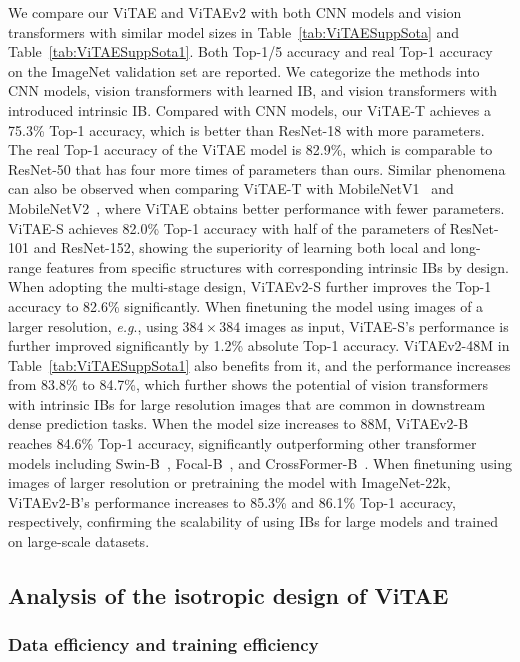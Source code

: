 \documentclass[twocolumn]{svjour3}          \smartqed  \usepackage{natbib}
\newcommand{\eg}{e.g}
\def\onedot{.\xspace}
\def\eg{\emph{e.g}\onedot}
\begin{document}
We compare our ViTAE and ViTAEv2 with both CNN models and vision transformers with similar model sizes in Table~\ref{tab:ViTAESuppSota} and Table~\ref{tab:ViTAESuppSota1}. Both Top-1/5 accuracy and real Top-1 accuracy~\citep{beyer2020we} on the ImageNet validation set are reported. We categorize the methods into CNN models, vision transformers with learned IB, and vision transformers with introduced intrinsic IB. Compared with CNN models, our ViTAE-T achieves a 75.3\% Top-1 accuracy, which is better than ResNet-18 with more parameters. The real Top-1 accuracy of the ViTAE model is 82.9\%, which is comparable to ResNet-50 that has four more times of parameters than ours. Similar phenomena can also be observed when comparing ViTAE-T with MobileNetV1~\citep{howard2017mobilenets} and MobileNetV2~\citep{sandler2018mobilenetv2}, where ViTAE obtains better performance with fewer parameters. ViTAE-S achieves 82.0\% Top-1 accuracy with half of the parameters of ResNet-101 and ResNet-152, showing the superiority of learning both local and long-range features from specific structures with corresponding intrinsic IBs by design. When adopting the multi-stage design, ViTAEv2-S further improves the Top-1 accuracy to 82.6\% significantly. When finetuning the model using images of a larger resolution, \eg, using $384 \times 384$ images as input, ViTAE-S's performance is further improved significantly by 1.2\% absolute Top-1 accuracy. ViTAEv2-48M in Table~\ref{tab:ViTAESuppSota1} also benefits from it, and the performance increases from 83.8\% to 84.7\%, which further shows the potential of vision transformers with intrinsic IBs for large resolution images that are common in downstream dense prediction tasks. When the model size increases to 88M, ViTAEv2-B reaches 84.6\% Top-1 accuracy, significantly outperforming other transformer models including Swin-B~\citep{liu2021swin}, Focal-B~\citep{yang2021focal}, and CrossFormer-B~\citep{wang2021crossformer}. When finetuning using images of larger resolution or pretraining the model with ImageNet-22k, ViTAEv2-B's performance increases to 85.3\% and 86.1\% Top-1 accuracy, respectively, confirming the scalability of using IBs for large models and trained on large-scale datasets.

\subsection{Analysis of the isotropic design of ViTAE}
\subsubsection{Data efficiency and training efficiency}
\end{document}
